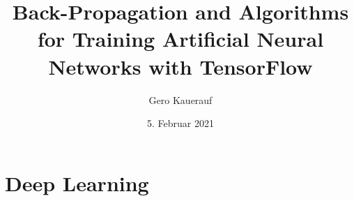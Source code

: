 \documentclass[t]{beamer}
\begin{document}

\title{Back-Propagation and Algorithms for Training Artificial Neural Networks with TensorFlow}
\date{5. Februar 2021}
\author{Gero Kauerauf}

\frame{\titlepage}

\section{Deep Learning}
\end{document}
